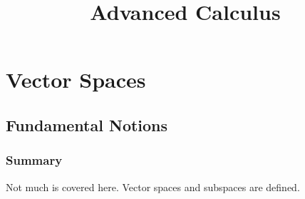 \documentclass[]{article}
\title{Advanced Calculus}
\author{}
\date{}
\theoremstyle{definition}
\begin{document}
\maketitle
\newpage
\tableofcontents
\newpage

\section{Vector Spaces}
\subsection{Fundamental Notions}
\subsubsection{Summary}
Not much is covered here. Vector spaces and subspaces are defined.
\end{document}

